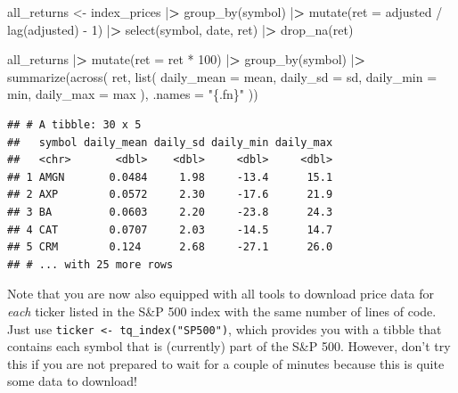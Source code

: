 \documentclass[
]{krantz}
\newenvironment{Shaded}{\begin{snugshade}}{\end{snugshade}}
\newcommand{\AttributeTok}[1]{\textcolor[rgb]{0.61,0.61,0.61}{#1}}
\newcommand{\DecValTok}[1]{\textcolor[rgb]{0.06,0.06,0.06}{#1}}
\newcommand{\ErrorTok}[1]{\textcolor[rgb]{0.14,0.14,0.14}{\textbf{#1}}}
\newcommand{\FunctionTok}[1]{\textcolor[rgb]{0,0,0}{#1}}
\newcommand{\NormalTok}[1]{#1}
\newcommand{\OtherTok}[1]{\textcolor[rgb]{0.37,0.37,0.37}{#1}}
\newcommand{\SpecialCharTok}[1]{\textcolor[rgb]{0,0,0}{#1}}
\newcommand{\StringTok}[1]{\textcolor[rgb]{0.5,0.5,0.5}{#1}}
\begin{document}
\begin{Shaded}
\begin{Highlighting}[]
\NormalTok{all\_returns }\OtherTok{\textless{}{-}}\NormalTok{ index\_prices }\SpecialCharTok{|}\ErrorTok{\textgreater{}}
  \FunctionTok{group\_by}\NormalTok{(symbol) }\SpecialCharTok{|}\ErrorTok{\textgreater{}}
  \FunctionTok{mutate}\NormalTok{(}\AttributeTok{ret =}\NormalTok{ adjusted }\SpecialCharTok{/} \FunctionTok{lag}\NormalTok{(adjusted) }\SpecialCharTok{{-}} \DecValTok{1}\NormalTok{) }\SpecialCharTok{|}\ErrorTok{\textgreater{}}
  \FunctionTok{select}\NormalTok{(symbol, date, ret) }\SpecialCharTok{|}\ErrorTok{\textgreater{}}
  \FunctionTok{drop\_na}\NormalTok{(ret)}

\NormalTok{all\_returns }\SpecialCharTok{|}\ErrorTok{\textgreater{}}
  \FunctionTok{mutate}\NormalTok{(}\AttributeTok{ret =}\NormalTok{ ret }\SpecialCharTok{*} \DecValTok{100}\NormalTok{) }\SpecialCharTok{|}\ErrorTok{\textgreater{}}
  \FunctionTok{group\_by}\NormalTok{(symbol) }\SpecialCharTok{|}\ErrorTok{\textgreater{}}
  \FunctionTok{summarize}\NormalTok{(}\FunctionTok{across}\NormalTok{(}
\NormalTok{    ret,}
    \FunctionTok{list}\NormalTok{(}
      \AttributeTok{daily\_mean =}\NormalTok{ mean,}
      \AttributeTok{daily\_sd =}\NormalTok{ sd,}
      \AttributeTok{daily\_min =}\NormalTok{ min,}
      \AttributeTok{daily\_max =}\NormalTok{ max}
\NormalTok{    ),}
    \AttributeTok{.names =} \StringTok{"\{.fn\}"}
\NormalTok{  ))}
\end{Highlighting}
\end{Shaded}

\begin{verbatim}
## # A tibble: 30 x 5
##   symbol daily_mean daily_sd daily_min daily_max
##   <chr>       <dbl>    <dbl>     <dbl>     <dbl>
## 1 AMGN       0.0484     1.98     -13.4      15.1
## 2 AXP        0.0572     2.30     -17.6      21.9
## 3 BA         0.0603     2.20     -23.8      24.3
## 4 CAT        0.0707     2.03     -14.5      14.7
## 5 CRM        0.124      2.68     -27.1      26.0
## # ... with 25 more rows
\end{verbatim}

Note that you are now also equipped with all tools to download price data for \emph{each} ticker listed in the S\&P 500 index with the same number of lines of code. Just use \texttt{ticker\ \textless{}-\ tq\_index("SP500")}, which provides you with a tibble that contains each symbol that is (currently) part of the S\&P 500. However, don't try this if you are not prepared to wait for a couple of minutes because this is quite some data to download!
\end{document}
